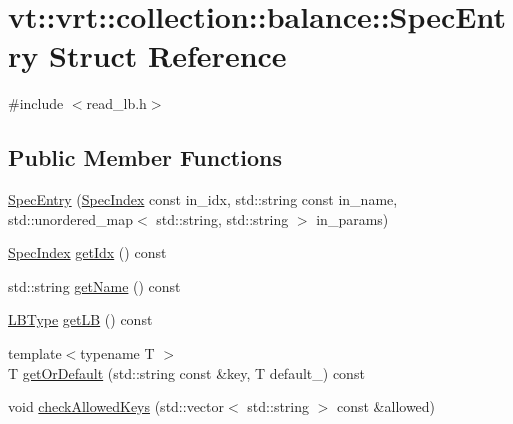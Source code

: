 \hypertarget{structvt_1_1vrt_1_1collection_1_1balance_1_1_spec_entry}{}\section{vt\+:\+:vrt\+:\+:collection\+:\+:balance\+:\+:Spec\+Entry Struct Reference}
\label{structvt_1_1vrt_1_1collection_1_1balance_1_1_spec_entry}


{\ttfamily \#include $<$read\+\_\+lb.\+h$>$}

\subsection*{Public Member Functions}
\begin{DoxyCompactItemize}
\item 
\hyperlink{structvt_1_1vrt_1_1collection_1_1balance_1_1_spec_entry_a69de4799079a46b5af62eccf974b7eef}{Spec\+Entry} (\hyperlink{namespacevt_1_1vrt_1_1collection_1_1balance_a72a5e0d9936ddf57f8e6c64e0e9fd123}{Spec\+Index} const in\+\_\+idx, std\+::string const in\+\_\+name, std\+::unordered\+\_\+map$<$ std\+::string, std\+::string $>$ in\+\_\+params)
\item 
\hyperlink{namespacevt_1_1vrt_1_1collection_1_1balance_a72a5e0d9936ddf57f8e6c64e0e9fd123}{Spec\+Index} \hyperlink{structvt_1_1vrt_1_1collection_1_1balance_1_1_spec_entry_a665d82dc37723e5392d215973eb1e73b}{get\+Idx} () const
\item 
std\+::string \hyperlink{structvt_1_1vrt_1_1collection_1_1balance_1_1_spec_entry_a1a6b18669456c0d4c9c311c63fd912c8}{get\+Name} () const
\item 
\hyperlink{namespacevt_1_1vrt_1_1collection_1_1balance_ac4f99693509affcc67db182d4aad9b5c}{L\+B\+Type} \hyperlink{structvt_1_1vrt_1_1collection_1_1balance_1_1_spec_entry_a265df7d1bc8ac20e92c7799fd4973018}{get\+LB} () const
\item 
{\footnotesize template$<$typename T $>$ }\\T \hyperlink{structvt_1_1vrt_1_1collection_1_1balance_1_1_spec_entry_ae5c35506e15c2123029d071a284b9367}{get\+Or\+Default} (std\+::string const \&key, T default\+\_\+) const
\item 
void \hyperlink{structvt_1_1vrt_1_1collection_1_1balance_1_1_spec_entry_a86ea05b64615f7be99e8db3baf195aae}{check\+Allowed\+Keys} (std\+::vector$<$ std\+::string $>$ const \&allowed)
\end{DoxyCompactItemize}



